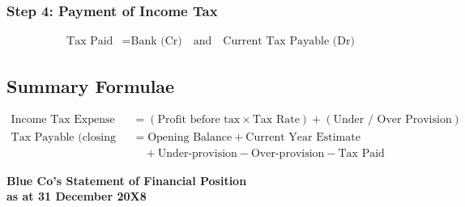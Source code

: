 \subsubsection{Step 4: Payment of Income Tax}
\begin{align*}
\text{Tax Paid} &= \text{Bank (Cr)} \quad \text{and} \quad \text{Current Tax Payable (Dr)}
\end{align*}

\subsection{Summary Formulae}
\begin{align*}
\text{Income Tax Expense} &= (\text{Profit before tax} \times \text{Tax Rate}) + (\text{Under / Over Provision}) \\
\text{Tax Payable (closing balance)} &= \text{Opening Balance} + \text{Current Year Estimate} \\
&\quad + \text{Under-provision} - \text{Over-provision} - \text{Tax Paid}
\end{align*}\begin{center}
\textbf{Blue Co’s Statement of Financial Position}\\
\textbf{as at 31 December 20X8}
\end{center}


